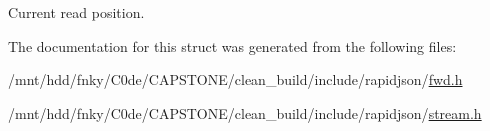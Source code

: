 Current read position. 



The documentation for this struct was generated from the following files\+:\begin{DoxyCompactItemize}
\item 
/mnt/hdd/fnky/\+C0de/\+C\+A\+P\+S\+T\+O\+N\+E/clean\+\_\+build/include/rapidjson/\hyperlink{fwd_8h}{fwd.\+h}\item 
/mnt/hdd/fnky/\+C0de/\+C\+A\+P\+S\+T\+O\+N\+E/clean\+\_\+build/include/rapidjson/\hyperlink{stream_8h}{stream.\+h}\end{DoxyCompactItemize}
